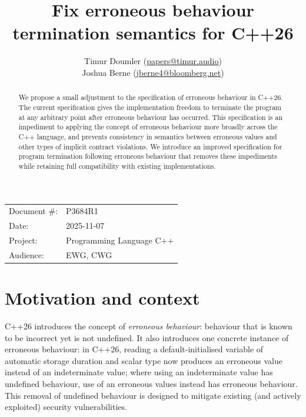 

 \usepackage[bottom]{footmisc} 



\title{Fix erroneous behaviour termination semantics for C++26}
\author{
  Timur Doumler \small(\href{mailto:papers@timur.audio}{papers@timur.audio}) \\
  Joshua Berne \small(\href{mailto:jberne4@bloomberg.net}{jberne4@bloomberg.net}) 
}
\date{}
\maketitle

\begin{tabular}{ll}
Document \#: & P3684R1 \\
Date: &2025-11-07 \\
Project: & Programming Language C++ \\
Audience: & EWG, CWG
\end{tabular}

\begin{abstract}
We propose a small adjustment to the specification of erroneous behaviour in C++26. The current specification gives the implementation  freedom to terminate the program at any arbitrary point after erroneous behaviour has occurred. This specification is an impediment to applying the concept of erroneous behaviour more broadly across the C++ language, and prevents consistency in semantics between erroneous values and other types of implicit contract violations. We introduce an improved specification for program termination following erroneous behaviour that removes these impediments while retaining full compatibility with existing implementations.
\end{abstract}


\section{Motivation and context}

C++26 introduces the concept of \emph{erroneous behaviour}: behaviour that is known to be incorrect yet is not undefined. It also introduces one concrete instance of erroneous behaviour: in C++26, reading a default-initialised variable of automatic storage duration and scalar type now produces an erroneous value instead of an indeterminate value; where using an indeterminate value has undefined behaviour, use of an erroneous values instead has erroneous behaviour. This removal of undefined behaviour is designed to mitigate existing (and actively exploited) security vulnerabilities.


